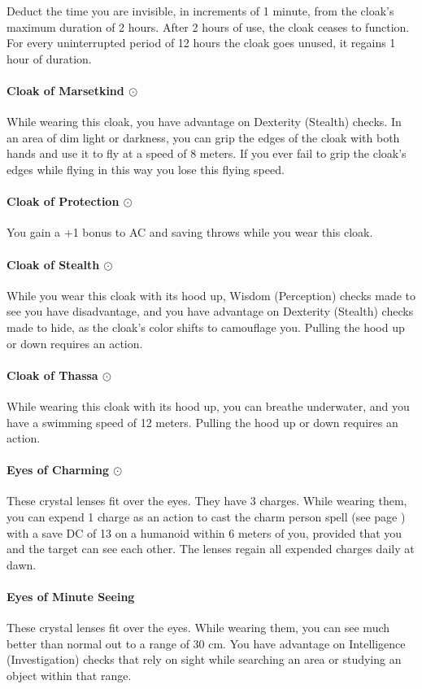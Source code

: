         Deduct the time you are invisible, in increments of 1 minute, from the cloak's maximum duration of 2 hours.
        After 2 hours of use, the cloak ceases to function.
        For every uninterrupted period of 12 hours the cloak goes unused, it regains 1 hour of duration.
    \paragraph{Cloak of Marsetkind $\odot$}
        While wearing this cloak, you have advantage on Dexterity (Stealth) checks.
        In an area of dim light or darkness, you can grip the edges of the cloak with both hands and use it to fly at a speed of 8 meters.
        If you ever fail to grip the cloak's edges while flying in this way you lose this flying speed.
    \paragraph{Cloak of Protection $\odot$}
        You gain a +1 bonus to AC and saving throws while you wear this cloak.
    \paragraph{Cloak of Stealth $\odot$}
        While you wear this cloak with its hood up, Wisdom (Perception) checks made to see you have disadvantage, and you have advantage on Dexterity (Stealth) checks made to hide, as the cloak's color shifts to camouflage you.
        Pulling the hood up or down requires an action.
    \paragraph{Cloak of Thassa $\odot$}
        While wearing this cloak with its hood up, you can breathe underwater, and you have a swimming speed of 12 meters.
        Pulling the hood up or down requires an action.
    \paragraph{Eyes of Charming $\odot$}
        These crystal lenses fit over the eyes.
        They have 3 charges.
        While wearing them, you can expend 1 charge as an action to cast the charm person spell (see page \pageref{spell::charmperson}) with a save DC of 13 on a humanoid within 6 meters of you, provided that you and the target can see each other.
        The lenses regain all expended charges daily at dawn.
    \paragraph{Eyes of Minute Seeing}
        These crystal lenses fit over the eyes.
        While wearing them, you can see much better than normal out to a range of 30 cm.
        You have advantage on Intelligence (Investigation) checks that rely on sight while searching an area or studying an object within that range.

